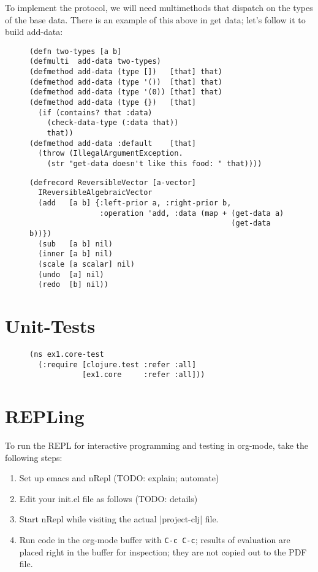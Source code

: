 \documentclass[11pt]{article}
\begin{document}
To implement the protocol, we will need multimethods that dispatch on
the types of the base data. There is an example of this above in get
data; let's follow it to build add-data:

\begin{figure}[H]
\label{add-data}
\begin{verbatim}
(defn two-types [a b]
(defmulti  add-data two-types)
(defmethod add-data (type [])   [that] that)
(defmethod add-data (type '())  [that] that)
(defmethod add-data (type '(0)) [that] that)
(defmethod add-data (type {})   [that]
  (if (contains? that :data)
    (check-data-type (:data that))
    that))
(defmethod add-data :default    [that]
  (throw (IllegalArgumentException.
    (str "get-data doesn't like this food: " that))))
\end{verbatim}
\end{figure}


\begin{figure}[H]
\label{reversible-algebraic-vector-on-vector}
\begin{verbatim}
(defrecord ReversibleVector [a-vector]
  IReversibleAlgebraicVector
  (add   [a b] {:left-prior a, :right-prior b,
                :operation 'add, :data (map + (get-data a)
                                              (get-data b))})
  (sub   [a b] nil)
  (inner [a b] nil)
  (scale [a scalar] nil)
  (undo  [a] nil)
  (redo  [b] nil))
\end{verbatim}
\end{figure}
\section{Unit-Tests}
\label{sec-4}

\begin{figure}[H]
\label{test-namespace}
\begin{verbatim}
(ns ex1.core-test
  (:require [clojure.test :refer :all]
            [ex1.core     :refer :all]))
\end{verbatim}
\end{figure}
\section{REPLing}
\label{sec-5}
\label{sec:emacs-repl}
To run the REPL for interactive programming and testing in org-mode,
take the following steps:
\begin{enumerate}
\item Set up emacs and nRepl (TODO: explain; automate)
\item Edit your init.el file as follows (TODO: details)
\item Start nRepl while visiting the actual |project-clj| file.
\item Run code in the org-mode buffer with \verb|C-c C-c|; results of
evaluation are placed right in the buffer for inspection; they are
not copied out to the PDF file.
\end{enumerate}
\end{document}
